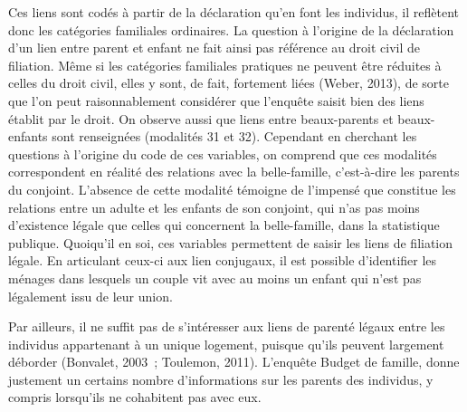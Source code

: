 \documentclass[
  12pt,
]{book}
\begin{document}
Ces liens sont codés à partir de la déclaration qu'en font les
individus, il reflètent donc les catégories familiales ordinaires. La
question à l'origine de la déclaration d'un lien entre parent et enfant
ne fait ainsi pas référence au droit civil de filiation. Même si les
catégories familiales pratiques ne peuvent être réduites à celles du
droit civil, elles y sont, de fait, fortement liées (Weber, 2013), de
sorte que l'on peut raisonnablement considérer que l'enquête saisit bien
des liens établit par le droit. On observe aussi que liens entre
beaux-parents et beaux-enfants sont renseignées (modalités 31 et 32).
Cependant en cherchant les questions à l'origine du code de ces
variables, on comprend que ces modalités correspondent en réalité des
relations avec la belle-famille, c'est-à-dire les parents du conjoint.
L'absence de cette modalité témoigne de l'impensé que constitue les
relations entre un adulte et les enfants de son conjoint, qui n'as pas
moins d'existence légale que celles qui concernent la belle-famille,
dans la statistique publique. Quoiqu'il en soi, ces variables permettent
de saisir les liens de filiation légale. En articulant ceux-ci aux lien
conjugaux, il est possible d'identifier les ménages dans lesquels un
couple vit avec au moins un enfant qui n'est pas légalement issu de leur
union.

Par ailleurs, il ne suffit pas de s'intéresser aux liens de parenté
légaux entre les individus appartenant à un unique logement, puisque
qu'ils peuvent largement déborder (Bonvalet, 2003~; Toulemon, 2011).
L'enquête Budget de famille, donne justement un certains nombre
d'informations sur les parents des individus, y compris lorsqu'ils ne
cohabitent pas avec eux.
\end{document}
